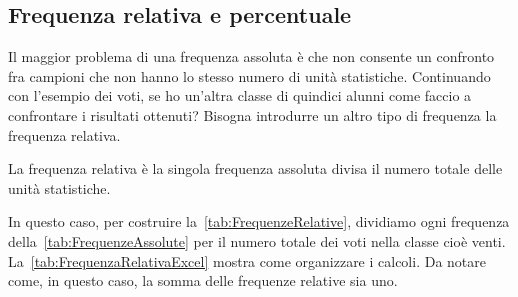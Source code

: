 \subsection{Frequenza relativa e percentuale}
Il maggior problema di una frequenza assoluta è che non consente un confronto fra campioni che non hanno lo stesso numero di unità statistiche. Continuando con l'esempio dei voti, se ho un'altra  classe di quindici alunni come faccio a confrontare i risultati ottenuti? Bisogna introdurre un altro tipo di frequenza la frequenza relativa. 
\begin{defn}
La frequenza relativa è la singola frequenza assoluta divisa il numero totale delle unità statistiche. 
\end{defn}
In questo caso, per costruire la~\vref{tab:FrequenzeRelative}, dividiamo ogni frequenza della~\vref{tab:FrequenzeAssolute} per il numero totale dei voti nella classe cioè venti. La~\vref{tab:FrequenzaRelativaExcel} mostra come organizzare i calcoli.  Da  notare come, in questo caso,  la somma delle frequenze relative sia uno. 

